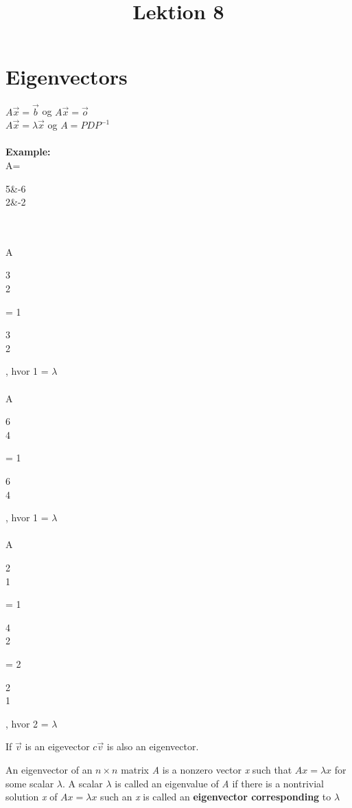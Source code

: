 \documentclass[danish,english]{article}
\title{Lektion 8}
\begin{document}
\maketitle

\section*{Eigenvectors}
$A\vec{x} = \vec{b}$ og $A\vec{x} = \vec{o}$\\
$A\vec{x} = \lambda\vec{x}$ og $A=PDP^{-1}$
\\
\\
\textbf{Example:}\\
A=
\begin{ArgMat}
5&-6\\
2&-2
\end{ArgMat}
\\
\\
A\begin{ArgMat}
3\\
2
\end{ArgMat} = 1
\begin{ArgMat}
3\\
2
\end{ArgMat}, hvor 1 = $\lambda$
\\
\\
A\begin{ArgMat}
6\\
4
\end{ArgMat} = 1
\begin{ArgMat}
6\\
4
\end{ArgMat}, hvor 1 = $\lambda$
\\
\\
A\begin{ArgMat}
2\\
1
\end{ArgMat} = 1
\begin{ArgMat}
4\\
2
\end{ArgMat} = 2
\begin{ArgMat}
2\\
1
\end{ArgMat}, hvor 2 = $\lambda$


\begin{theo}[Definition] 
If $\vec{v}$ is an eigevector $c\vec{v}$ is also an eigenvector.
\end{theo}

\begin{theo}[Definition] 
An eigenvector of an $n \times n$ matrix \textit{A} is a nonzero vector \textit{x} such that $Ax = \lambda x$ for some scalar $\lambda$. 
A scalar $\lambda$ is called an eigenvalue of \textit{A} if there is a nontrivial solution \textit{x} of $Ax = \lambda x$ such an \textit{x} is called an \textbf{eigenvector corresponding} to $\lambda$
\end{theo}
\end{document}
